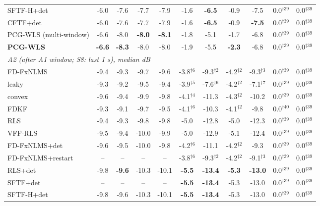 \begin{table}[t]
{\begin{tabular}{lcccccccccc}
SFTF-H+det & -6.0 & -7.6 & -7.7 & -7.9 & -1.6 & \textbf{-6.5} & -0.9 & -7.5 & 0.0$^{\dagger39}$ & 0.0$^{\dagger39}$ \\
CFTF+det & -6.0 & -7.6 & -7.7 & -7.9 & -1.6 & \textbf{-6.5} & -0.9 & \textbf{-7.5} & 0.0$^{\dagger39}$ & 0.0$^{\dagger39}$ \\
PCG-WLS (multi-window) & -6.6 & -8.0 & \textbf{-8.0} & \textbf{-8.1} & -1.8 & -5.1 & -1.7 & -6.8 & 0.0$^{\dagger39}$ & 0.0$^{\dagger39}$ \\
\textbf{PCG-WLS} & \textbf{-6.6} & \textbf{-8.3} & -8.0 & -8.0 & -1.9 & -5.5 & \textbf{-2.3} & -6.8 & 0.0$^{\dagger39}$ & 0.0$^{\dagger39}$ \\
\midrule
\multicolumn{11}{l}{\emph{A2 (after A1 window; S8: last 1 s), median dB}}\\
FD-FxNLMS & -9.4 & -9.3 & -9.7 & -9.6 & -3.8$^{\dagger6}$ & -9.3$^{\dagger2}$ & -4.2$^{\dagger2}$ & -9.3$^{\dagger3}$ & 0.0$^{\dagger39}$ & 0.0$^{\dagger39}$ \\
leaky & -9.3 & -9.2 & -9.5 & -9.4 & -3.9$^{\dagger5}$ & -7.6$^{\dagger6}$ & -4.2$^{\dagger2}$ & -7.1$^{\dagger7}$ & 0.0$^{\dagger39}$ & 0.0$^{\dagger39}$ \\
convex & -9.6 & -9.4 & -9.9 & -9.8 & -4.1$^{\dagger4}$ & -11.3 & -4.3$^{\dagger2}$ & -10.2 & 0.0$^{\dagger39}$ & 0.0$^{\dagger39}$ \\
FDKF & -9.3 & -9.1 & -9.7 & -9.5 & -4.1$^{\dagger6}$ & -10.3 & -4.1$^{\dagger2}$ & -9.8 & 0.0$^{\dagger40}$ & 0.0$^{\dagger39}$ \\
RLS & -9.4 & -9.3 & -9.8 & -9.8 & -5.0 & -12.8 & -5.0 & -12.3 & 0.0$^{\dagger39}$ & 0.0$^{\dagger39}$ \\
VFF-RLS & -9.5 & -9.4 & -10.0 & -9.9 & -5.0 & -12.9 & -5.1 & -12.4 & 0.0$^{\dagger39}$ & 0.0$^{\dagger39}$ \\
FD-FxNLMS+det & -9.6 & -9.5 & -10.0 & -9.8 & -4.2$^{\dagger6}$ & -11.1 & -4.2$^{\dagger2}$ & -9.3 & 0.0$^{\dagger39}$ & 0.0$^{\dagger39}$ \\
FD-FxNLMS+restart & -- & -- & -- & -- & -3.8$^{\dagger6}$ & -9.3$^{\dagger2}$ & -4.2$^{\dagger2}$ & -9.1$^{\dagger3}$ & 0.0$^{\dagger39}$ & 0.0$^{\dagger39}$ \\
RLS+det & -9.8 & \textbf{-9.6} & -10.3 & -10.1 & \textbf{-5.5} & \textbf{-13.4} & \textbf{-5.3} & \textbf{-13.0} & 0.0$^{\dagger39}$ & 0.0$^{\dagger39}$ \\
SFTF+det & -- & -- & -- & -- & \textbf{-5.5} & \textbf{-13.4} & -5.3 & -13.0 & 0.0$^{\dagger39}$ & 0.0$^{\dagger39}$ \\
SFTF-H+det & -9.8 & -9.6 & -10.3 & -10.1 & \textbf{-5.5} & \textbf{-13.4} & -5.3 & -13.0 & 0.0$^{\dagger39}$ & 0.0$^{\dagger39}$ \\

\end{tabular}}
\end{table}
